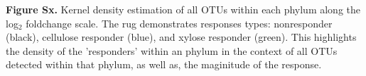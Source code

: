 \textbf{Figure Sx.} Kernel density estimation of all OTUs within each phylum along the log$_{2}$ foldchange scale. The rug demonstrates responses types: nonresponder (black), cellulose responder (blue), and xylose responder (green). This highlights the density of the 'responders' within an phylum in the context of all OTUs detected within that phylum, as well as, the maginitude of the response.   